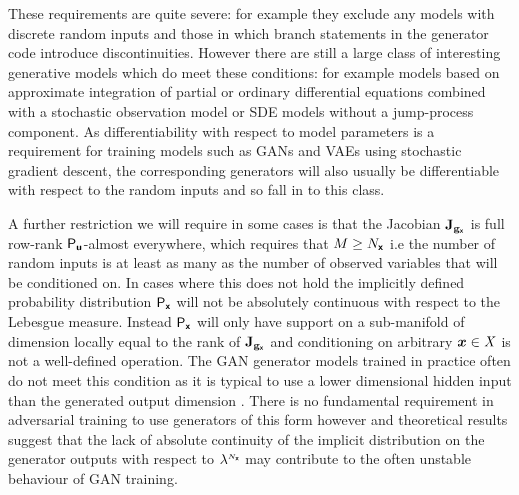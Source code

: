 These requirements are quite severe: for example they exclude any models with discrete random inputs and those in which branch statements in the generator code introduce discontinuities. However there are still a large class of interesting generative models which do meet these conditions: for example models based on approximate integration of partial or ordinary differential equations combined with a stochastic observation model or \acs{SDE} models without a jump-process component. As differentiability with respect to model parameters is a requirement for training models such as \acp{GAN} and \acp{VAE} using stochastic gradient descent, the corresponding generators will also usually be differentiable with respect to the random inputs and so fall in to this class.

A further restriction we will require in some cases is that the Jacobian $\mathbf{J}_{{\mathbf{g}}_{\boldsymbol{\mathsf{x}}}}$ is full row-rank $\mathsf{P}_{\boldsymbol{\mathsf{u}}}$-almost everywhere, which requires that $M \geq N_{\boldsymbol{\mathsf{x}}}$ i.e the number of random inputs is at least as many as the number of observed variables that will be conditioned on. In cases where this does not hold the implicitly defined probability distribution $\mathsf{P}_{\boldsymbol{\mathsf{x}}}$ will not be absolutely continuous with respect to the Lebesgue measure. Instead $\mathsf{P}_{\boldsymbol{\mathsf{x}}}$ will only have support on a sub-manifold of dimension locally equal to the rank of $\mathbf{J}_{{\mathbf{g}}_{\boldsymbol{\mathsf{x}}}}$ and conditioning on arbitrary $\boldsymbol{x} \in \mathit{X}$ is not a well-defined operation. The \ac{GAN} generator models trained in practice often do not meet this condition as it is typical to use a lower dimensional hidden input than the generated output dimension \citep{arjovsky2017towards}. There is no fundamental requirement in adversarial training to use generators of this form however and theoretical results \citep{arjovsky2017towards} suggest that the lack of absolute continuity of the implicit distribution on the generator outputs with respect to $\lebm{N_{\rvct{x}}}$ may contribute to the often unstable behaviour of \ac{GAN} training.


